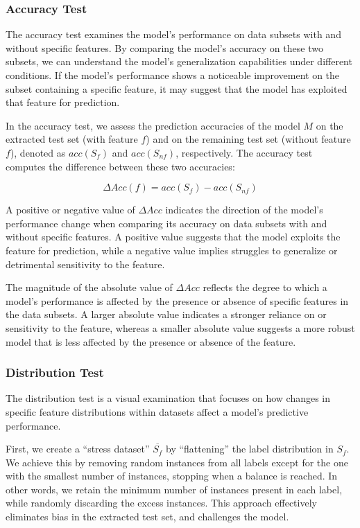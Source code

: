 \subsubsection{Accuracy Test}
\label{sec:accuracytest}
The accuracy test examines the model's performance on data 
subsets with and without specific features. 
By comparing the model's accuracy on these two subsets, 
we can understand the model's generalization 
capabilities under different conditions. 
If the model's performance shows a noticeable improvement 
on the subset containing a specific feature, 
it may suggest that the model has exploited that feature for prediction.

In the accuracy test, we assess the prediction accuracies 
of the model $M$ on the extracted test set (with feature $f$) 
and on the remaining test set (without feature $f$), 
denoted as $acc(S_f)$ and $acc(S_{nf})$, respectively. 
The accuracy test computes the difference between these two accuracies:

\begin{equation}
\Delta Acc(f) = acc(S_f) - acc(S_{nf})
\end{equation}

A positive or negative value of 
$\Delta Acc$ indicates the direction of the model's performance 
change when comparing its accuracy on data subsets with 
and without specific features. A positive value 
suggests that the model exploits the feature for prediction, 
while a negative value implies struggles to 
generalize or detrimental sensitivity to the feature.

The magnitude of the absolute value of $\Delta Acc$ 
reflects the degree to which a model's performance 
is affected by the presence or absence 
of specific features in the data subsets. 
A larger absolute value indicates a 
stronger reliance on or sensitivity to the feature, 
whereas a smaller absolute value suggests a more 
robust model that is less affected by 
the presence or absence of the feature.


\subsubsection{Distribution Test}
\label{sec:distributiontest}
The distribution test is a visual examination that focuses 
on how changes in specific feature distributions 
within datasets affect a model's predictive performance.

First, we create a ``stress dataset'' $\overline{S_f}$ by 
``flattening'' the label distribution in $S_f$. 
We achieve this by removing random instances from all 
labels except for the one with the smallest number of instances, 
stopping when a balance is reached. In other words, 
we retain the minimum number of instances present in each label, 
while randomly discarding the excess instances. 
This approach effectively eliminates bias in the extracted test set, and challenges the model.

